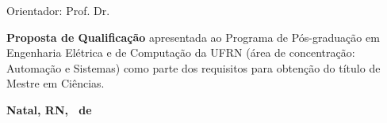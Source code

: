 \begin{titlepage}
\begin{center}

\LARGE
\textbf{\titulo}

\vfill

\Large
\textbf{\autor}

\vfill

\normalsize
Orientador: Prof. Dr. \orientador

\vfill

\hfill
\parbox{0.5\linewidth}{\textbf{Proposta de Qualificação} apresentada ao Programa
de Pós-graduação em Engenharia Elétrica e de Computação da UFRN (área de
concentração: Automação e Sistemas) como parte dos requisitos para obtenção do
título de Mestre em Ciências.}

\vfill

\large
\textbf{Natal, RN, \Mesaprovacao\ de \Anoaprovacao}

\end{center}

\end{titlepage}
